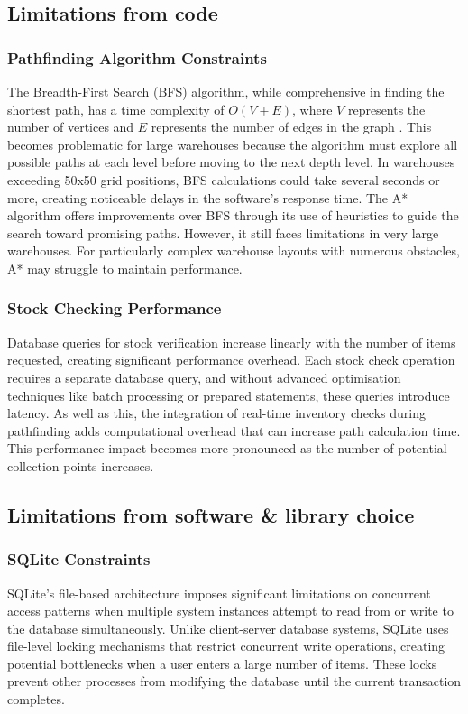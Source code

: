 \subsection{Limitations from code}

\subsubsection{Pathfinding Algorithm Constraints}
The Breadth-First Search (BFS) algorithm, while comprehensive in finding the shortest path, has a time complexity of \( O(V + E) \), where \( V \) represents the number of vertices and \( E \) represents the number of edges in the graph \cite{bfs_time}. This becomes problematic for large warehouses because the algorithm must explore all possible paths at each level before moving to the next depth level. In warehouses exceeding 50x50 grid positions, BFS calculations could take several seconds or more, creating noticeable delays in the software's response time. The A* algorithm offers improvements over BFS through its use of heuristics to guide the search toward promising paths. However, it still faces limitations in very large warehouses. For particularly complex warehouse layouts with numerous obstacles, A* may struggle to maintain performance.


\subsubsection{Stock Checking Performance}
Database queries for stock verification increase linearly with the number of items requested, creating significant performance overhead. Each stock check operation requires a separate database query, and without advanced optimisation techniques like batch processing or prepared statements, these queries introduce latency. As well as this, the integration of real-time inventory checks during pathfinding adds computational overhead that can increase path calculation time. This performance impact becomes more pronounced as the number of potential collection points increases.

\subsection{Limitations from software \& library choice}

\subsubsection{SQLite Constraints}
SQLite's file-based architecture imposes significant limitations on concurrent access patterns when multiple system instances attempt to read from or write to the database simultaneously. Unlike client-server database systems, SQLite uses file-level locking mechanisms \cite{sqlite_locking_v3} that restrict concurrent write operations, creating potential bottlenecks when a user enters a large number of items. These locks prevent other processes from modifying the database until the current transaction completes.


